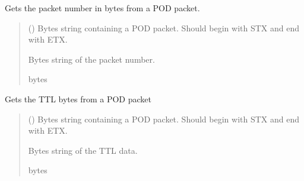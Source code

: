 \documentclass[letterpaper,10pt,english]{sphinxmanual}
\begin{document}
\begin{fulllineitems}
\begin{fulllineitems}
\label{\detokenize{PodApi.Packets:PodApi.Packets.Binary4.PacketBinary4.GetPacketNumber}}
\pysigstartsignatures
{}
\pysigstopsignatures
\sphinxAtStartPar
Gets the packet number in bytes from a POD packet.
\begin{quote}\begin{description}
\sphinxAtStartPar
{} () \textendash{} Bytes string containing a POD packet. Should begin with STX and                 end with ETX.

\sphinxAtStartPar
Bytes string of the packet number.

\sphinxAtStartPar
bytes

\end{description}\end{quote}

\end{fulllineitems}


\begin{fulllineitems}
\label{\detokenize{PodApi.Packets:PodApi.Packets.Binary4.PacketBinary4.GetTTL}}
\pysigstartsignatures
{}
\pysigstopsignatures
\sphinxAtStartPar
Gets the TTL bytes from a POD packet
\begin{quote}\begin{description}
\sphinxAtStartPar
{} () \textendash{} Bytes string containing a POD packet. Should begin with STX and                 end with ETX.

\sphinxAtStartPar
Bytes string of the TTL data.

\sphinxAtStartPar
bytes


\end{description}
\end{quote}
\end{fulllineitems}
\end{fulllineitems}
\end{document}
